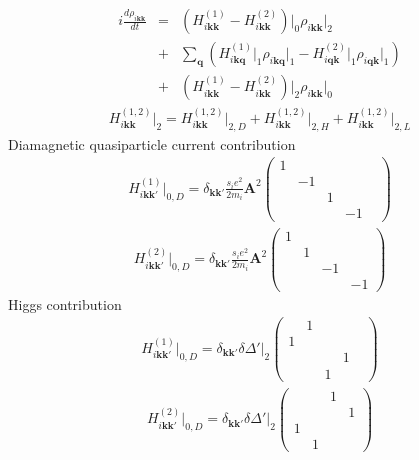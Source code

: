 \documentclass[aps,prb,reprint,noeprint,superscriptaddress]{revtex4-1}
\begin{document}
\begin{eqnarray*}
  i\frac{d \rho_{i\mathbf{k}\mathbf{k}}}{dt}
  &=&
    \left( 
      H_{i\mathbf{kk}}^{(1)}  - H_{i\mathbf{kk}}^{(2)} 
    \right)\bigg|_0
    \rho_{i\mathbf{kk}}\big|_2
    \\
    &+&
    \sum_{\mathbf{q}}^{}
    \left( 
    H_{i\mathbf{kq}}^{(1)}\big|_1 \rho_{i\mathbf{kq}}\big|_1 -
    H_{i\mathbf{qk}}^{(2)}\big|_1 \rho_{i\mathbf{qk}}\big|_1
    \right)
    \\
    &+&
    \left( 
      H_{i\mathbf{kk}}^{(1)} - H_{i\mathbf{kk}}^{(2)} 
    \right)\bigg|_2
      \rho_{i\mathbf{kk}}\big|_0
\end{eqnarray*}
\begin{eqnarray*}
  H_{i\mathbf{kk}}^{(1,2)}\big|_2 = 
  H_{i\mathbf{kk}}^{(1,2)}\big|_{2,D}
  +H_{i\mathbf{kk}}^{(1,2)}\big|_{2,H}
  +H_{i\mathbf{kk}}^{(1,2)}\big|_{2,L}
\end{eqnarray*}
Diamagnetic quasiparticle current contribution
\begin{eqnarray*}
  H_{i\mathbf{kk'}}^{(1)}\big|_{0,D}
  =
  \delta_{\mathbf{kk'}} \frac{s_ie^2}{2m_i}\mathbf{A}^2
  \begin{pmatrix}
    1 &  & & \\
     & -1 & & \\
    && 1 &  \\
    &&  & -1& 
  \end{pmatrix}
\end{eqnarray*}
\begin{eqnarray*}
  H_{i\mathbf{kk'}}^{(2)}\big|_{0,D}
  =
  \delta_{\mathbf{kk'}} \frac{s_ie^2}{2m_i}\mathbf{A}^2
  \begin{pmatrix}
    1 &&  & \\
    & 1 &&  \\
     && -1 & \\
    &  &&-1 
  \end{pmatrix}
\end{eqnarray*}
Higgs contribution
\begin{eqnarray*}
  H_{i\mathbf{kk'}}^{(1)}\big|_{0,D}
  =
  \delta_{\mathbf{kk'}} \delta \Delta'\big|_2
  \begin{pmatrix}
     & 1 & & \\
    1 &  & & \\
    &&  & 1 \\
    && 1 &  & 
  \end{pmatrix}
\end{eqnarray*}
\begin{eqnarray*}
  H_{i\mathbf{kk'}}^{(2)}\big|_{0,D}
  =
  \delta_{\mathbf{kk'}} \delta \Delta'\big|_2
  \begin{pmatrix}
     && 1 & \\
    &  && 1 \\
    1 &&  & \\
    & 1 && 
  \end{pmatrix}
\end{eqnarray*}
\end{document}
